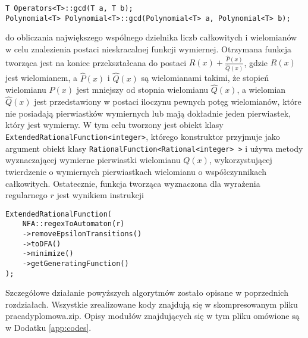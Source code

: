 \begin{verbatim}
T Operators<T>::gcd(T a, T b);
Polynomial<T> Polynomial<T>::gcd(Polynomial<T> a, Polynomial<T> b);
\end{verbatim}
do obliczania największego wspólnego dzielnika liczb całkowitych i wielomianów w celu znalezienia postaci nieskracalnej funkcji wymiernej. Otrzymana funkcja tworząca jest na koniec przekształcana do postaci $R(x)+\frac{\hat{P}(x)}{\hat{Q}(x)}$, gdzie $R(x)$ jest wielomianem, a $\hat{P}(x)$ i $\hat{Q}(x)$ są wielomianami takimi, że stopień wielomianu $\hat{P}(x)$ jest mniejszy od stopnia wielomianu $\hat{Q}(x)$, a wielomian $\hat{Q}(x)$ jest przedstawiony w postaci iloczynu pewnych potęg wielomianów, które nie posiadają pierwiastków wymiernych lub mają dokładnie jeden pierwiastek, który jest wymierny. W tym celu tworzony jest obiekt klasy \texttt{ExtendedRationalFunction<integer>}, którego konstruktor przyjmuje jako argument obiekt klasy \texttt{RationalFunction<Rational<integer> >} i używa metody wyznaczającej wymierne pierwiastki wielomianu $Q(x)$, wykorzystującej twierdzenie o wymiernych pierwiastkach wielomianu o współczynnikach całkowitych. Ostatecznie, funkcja tworząca wyznaczona dla wyrażenia regularnego $r$ jest wynikiem instrukcji
\begin{verbatim}
ExtendedRationalFunction(
    NFA::regexToAutomaton(r)
    ->removeEpsilonTransitions()
    ->toDFA()
    ->minimize()
    ->getGeneratingFunction()
);
\end{verbatim}

Szczegółowe działanie powyższych algorytmów zostało opisane w poprzednich rozdziałach. Wszystkie zrealizowane kody znajdują się w skompresowanym pliku praca\textunderscore dyplomowa.zip. Opisy modułów znajdujących się w tym pliku omówione są w Dodatku \ref{app:codes}.